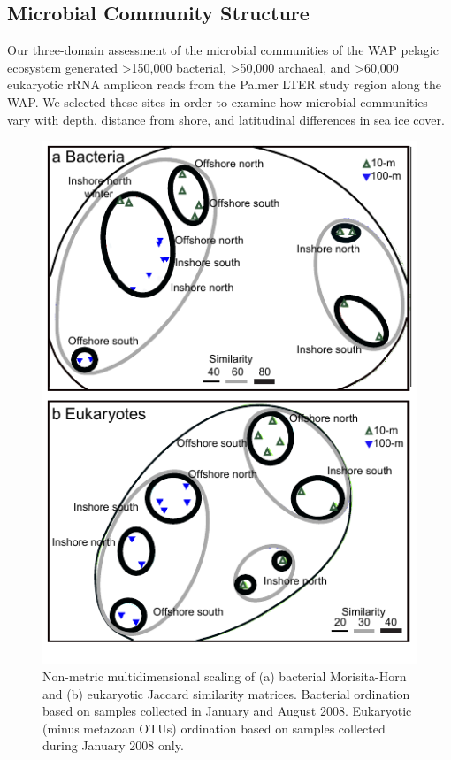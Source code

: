 \subsection{Microbial Community Structure}\label{ssc:microbial-community-structure}

Our three-domain assessment of the microbial communities of the WAP pelagic ecosystem generated \textgreater{}150,000 bacterial, \textgreater{}50,000 archaeal, and \textgreater{}60,000 eukaryotic rRNA amplicon reads from the Palmer LTER study region along the WAP. We selected these sites in order to examine how microbial communities vary with depth, distance from shore, and latitudinal differences in sea ice cover.

\begin{figure}
	[htbp] \centering 
	\includegraphics{Chapter_2_MIRADA/Figures/Figure_2_MDS_new_2012_75mm_BW_2013} 
	\caption[Non-metric multidimensional scaling of bacterial Morisita-Horn and eukaryotic Jaccard similarity matrices.]{Non-metric multidimensional scaling of (a) bacterial Morisita-Horn and (b) eukaryotic Jaccard similarity matrices. Bacterial ordination based on samples collected in January and August 2008. Eukaryotic (minus metazoan OTUs) ordination based on samples collected during January 2008 only.} 
	\label{fig:nmds1.1} 
\end{figure}

